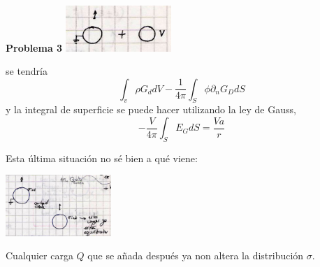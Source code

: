 \documentclass[10pt,oneside]{CBFT_book}
\begin{document}
\begin{ejemplo}{\bf Problema 3}
\includegraphics[width=0.3\textwidth]{images/fig_ft1_problema3C.jpg}

se tendría 
\[
	\int_v \rho G_d dV - \frac{1}{4\pi} \int_S \phi \partial_n G_D dS
\]
y la integral de superficie se puede hacer utilizando la ley de Gauss,
\[
	-\frac{V}{4\pi} \int_S E_G dS = \frac{Va}{r}
\]


Esta última situación no sé bien a qué viene:

\includegraphics[width=0.3\textwidth]{images/fig_ft1_problema3D.jpg}

Cualquier carga $Q$ que se añada después ya non altera la distribución $\sigma$.

\end{ejemplo}
\end{document}
